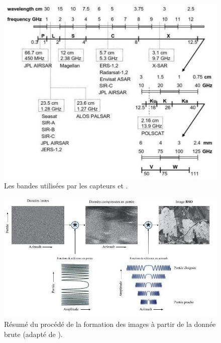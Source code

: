 \begin{figure}[!htbp] 
  \includegraphics[width=0.80 \linewidth]{figures/sar-bands-diagram.jpg}
   \centering
\caption
{\small Les bandes utilisées par les capteurs \acrsar et \acrpolsarns.  \cite{Richards:2009:RSI:1816335}}
  \label{fig:sar-bands-diagram}
\end{figure}

\begin{figure}[!htbp] 
  \includegraphics[width=1.0 \linewidth]{figures/sar-processing-diagram.jpg}
   \centering
\caption
{\small Résumé du procédé de la formation des images \acrsar à partir de la donnée brute (adapté de \cite{SarTutorial2013}). } 
  \label{fig:sar-processing-diagram}
\end{figure}

